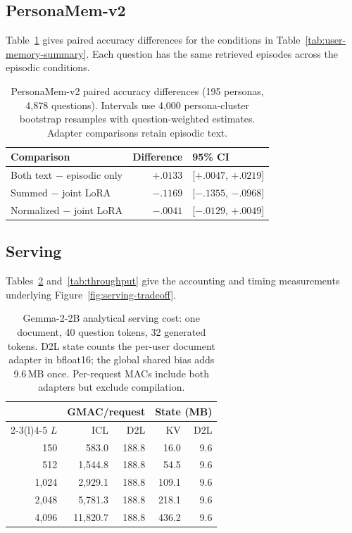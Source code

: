 \subsection{PersonaMem-v2}
Table~\ref{tab:personamem} gives paired accuracy differences for the
conditions in Table~\ref{tab:user-memory-summary}. Each question has the
same retrieved episodes across the episodic conditions.
\begin{table}[t]
\centering
\caption{PersonaMem-v2 paired accuracy differences (195 personas,
4,878 questions). Intervals use 4,000 persona-cluster bootstrap resamples
with question-weighted estimates. Adapter comparisons retain episodic text.}
\label{tab:personamem}
\small\setlength{\tabcolsep}{3pt}
\begin{tabular}{@{}lrl@{}}
\toprule
Comparison & Difference & 95\% CI \\
\midrule
Both text $-$ episodic only & $+.0133$ & [$+.0047$, $+.0219$] \\
Summed $-$ joint LoRA & $-.1169$ & [$-.1355$, $-.0968$] \\
Normalized $-$ joint LoRA & $-.0041$ & [$-.0129$, $+.0049$] \\
\bottomrule
\end{tabular}
\end{table}

\subsection{Serving}
Tables~\ref{tab:cost-length} and~\ref{tab:throughput} give the accounting
and timing measurements underlying Figure~\ref{fig:serving-tradeoff}.
\begin{table}[t]
\centering
\caption{Gemma-2-2B analytical serving cost: one document, 40 question tokens,
32 generated tokens. D2L state counts the per-user document adapter in bfloat16;
the global shared bias adds 9.6\,MB once. Per-request MACs include both adapters
but exclude compilation.}
\label{tab:cost-length}
\small\setlength{\tabcolsep}{3pt}
\begin{tabular}{@{}rrrrr@{}}
\toprule
& \multicolumn{2}{c}{GMAC/request} & \multicolumn{2}{c}{State (MB)} \\
\cmidrule(lr){2-3}\cmidrule(l){4-5}
$L$ & ICL & D2L & KV & D2L \\
\midrule
150 & 583.0 & 188.8 & 16.0 & 9.6 \\
512 & 1{,}544.8 & 188.8 & 54.5 & 9.6 \\
1{,}024 & 2{,}929.1 & 188.8 & 109.1 & 9.6 \\
2{,}048 & 5{,}781.3 & 188.8 & 218.1 & 9.6 \\
4{,}096 & 11{,}820.7 & 188.8 & 436.2 & 9.6 \\
\bottomrule
\end{tabular}
\end{table}

